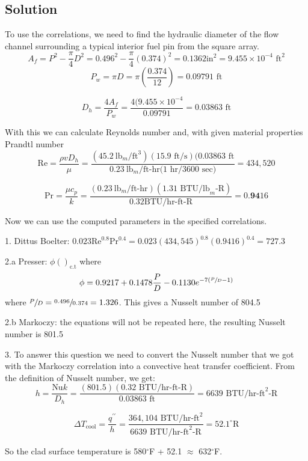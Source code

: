 \begin{fullwidth}
\subsection{Solution}
To use the correlations, we need to find the hydraulic diameter of the flow channel surrounding a typical interior fuel pin from the square array.
\begin{equation*}
A_f = P^2 - \frac{\pi}{4}D^2 = 0.496^2 - \frac{\pi}{4}(0.374)^2 = 0.1362 \text{in}^2 = 9.455 \times 10^{-4} \text{ ft}^2
\end{equation*}
\begin{equation*}
P_w = \pi D = \pi \left(\frac{0.374}{12} \right) = 0.09791 \text{ ft}
\end{equation*}

\begin{equation*}
D_h = \frac{4 A_f}{P_w} = \frac{4 (9.455 \times 10^{-4}}{0.09791} = 0.03863 \text{ ft}
\end{equation*}

With this we can calculate Reynolds number and, with given material properties Prandtl number
\begin{equation*}
\text{Re} = \frac{\rho v D_h}{\mu} = \frac{(45.2\  \text{lb}_m/\text{ft}^3)(15.9 \text{ ft/s})(0.03863 \text{ ft}}{0.23 \ \text{lb}_m\text{/ft-hr} \text{(1 hr/3600 sec)}} = 434,520
\end{equation*}

\begin{equation*}
\text{Pr} = \frac{\mu c_p}{k}= \frac{(0.23 \ \text{lb}_m\text{/ft-hr})(1.31 \text{ BTU/lb}_m\text{-R})}{0.32 \text{BTU/hr-ft-R}} = 0.\textbf{94}16
\end{equation*}

Now we can use the computed parameters in the specified correlations.

1. Dittus Boelter: $0.023 \text{Re}^{0.8}\text{Pr}^{0.4} = 0.023(434,545)^{0.8}(0.9416)^{0.4} = 727.3$

2.a Presser: $\phi\left( \right)_{\text{c.t}}$ where
$$ \phi = 0.9217 + 0.1478 \frac{P}{D} - 0.1130 e^{-7 \left(\sfrac{P}{D}-1 \right)}$$
where $\sfrac{P}{D} = \sfrac{0.496}{0.374} = 1.326$.  This gives a Nusselt number of 804.5

2.b Markoczy: the equations will not be repeated here, the resulting Nusselt number is 801.5

3. To answer this question we need to convert the Nusselt number that we got with the Markoczy correlation into a convective heat transfer coefficient.  From the definition of Nusselt number, we get:
$$h = \frac{\text{Nu} k}{D_h} = \frac{(801.5) (0.32 \text{ BTU/hr-ft-R})}{0.03863 \text{ ft}} = 6639 \text{ BTU/hr-ft}^{2}\text{-R}$$

$$\Delta T_{\text{cool}} = \frac{q^{\prime \prime}}{h} = \frac{364,104 \text{ BTU/hr-ft}^2}{6639 \text{ BTU/hr-ft}^{2}\text{-R}} =  52.1^{\circ}\text{R}$$

So the clad surface temperature is 580$^{\circ}$F + 52.1 $\approx$ 632$^{\circ}$F.
 

\end{fullwidth}
